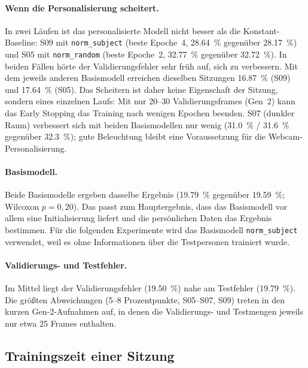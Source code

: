 \documentclass[
  11pt,
  a4paper,
  oneside,
  DIV=12,
  BCOR=8mm,
  parskip=half,
  headings=normal,
  bibliography=totoc,
  listof=totoc
]{scrreprt}
\newcommand{\code}[1]{\texttt{#1}}
\begin{document}
\paragraph{Wenn die Personalisierung scheitert.}
In zwei Läufen ist das personalisierte Modell nicht besser als die
Konstant-Baseline: S09 mit \code{norm\_subject} (beste Epoche~4,
\SI{28,64}{\percent} gegenüber \SI{28,17}{\percent}) und S05 mit
\code{norm\_random} (beste Epoche~2, \SI{32,77}{\percent} gegenüber
\SI{32,72}{\percent}). In beiden Fällen hörte der Validierungsfehler sehr früh
auf, sich zu verbessern. Mit dem jeweils anderen Basismodell erreichen
dieselben Sitzungen \SI{16,87}{\percent} (S09) und \SI{17,64}{\percent} (S05).
Das Scheitern ist daher keine Eigenschaft der Sitzung, sondern eines
einzelnen Laufs: Mit nur 20--30 Validierungsframes (Gen~2) kann das Early
Stopping das Training nach wenigen Epochen beenden. S07 (dunkler Raum)
verbessert sich mit beiden Basismodellen nur wenig (\SI{31,0}{\percent} /
\SI{31,6}{\percent} gegenüber \SI{32,3}{\percent}); gute Beleuchtung bleibt
eine Voraussetzung für die Webcam-Personalisierung.

\paragraph{Basismodell.}
Beide Basismodelle ergeben dasselbe Ergebnis (\SI{19,79}{\percent} gegenüber
\SI{19,59}{\percent}; Wilcoxon $p=0,20$). Das passt zum Hauptergebnis, dass
das Basismodell vor allem eine Initialisierung liefert und die persönlichen
Daten das Ergebnis bestimmen. Für die folgenden Experimente wird das
Basismodell \code{norm\_subject} verwendet, weil es ohne Informationen über
die Testpersonen trainiert wurde.

\paragraph{Validierungs- und Testfehler.} Im Mittel liegt der
Validierungsfehler (\SI{19,50}{\percent}) nahe am Testfehler
(\SI{19,79}{\percent}). Die größten Abweichungen (5--8 Prozentpunkte,
S05--S07, S09) treten in den kurzen Gen-2-Aufnahmen auf, in denen die
Validierungs- und Testmengen jeweils nur etwa 25 Frames enthalten.

\subsection{Trainingszeit einer Sitzung}
\label{sec:session_time}
\end{document}
